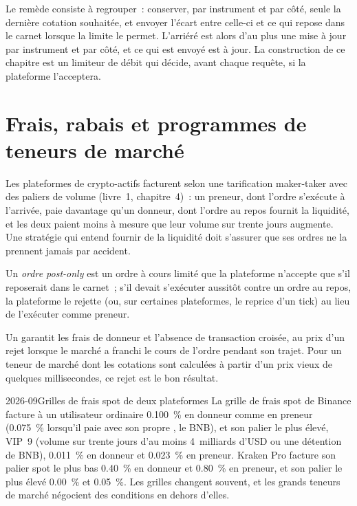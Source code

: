 Le remède consiste à regrouper~: conserver, par instrument et par côté, seule la dernière cotation souhaitée, et envoyer
l'écart entre celle-ci et ce qui repose dans le carnet lorsque la limite le permet. L'arriéré est alors d'au plus une
mise à jour par instrument et par côté, et ce qui est envoyé est à jour. La construction de ce chapitre est un limiteur
de débit qui décide, avant chaque requête, si la plateforme l'acceptera.

\section{Frais, rabais et programmes de teneurs de marché}

Les plateformes de crypto-actifs facturent selon une tarification maker-taker avec des paliers de volume (livre~1, chapitre~4)~: un preneur,
dont l'ordre s'exécute à l'arrivée, paie davantage qu'un donneur, dont l'ordre au repos fournit la liquidité, et les deux
paient moins à mesure que leur volume sur trente jours augmente. Une stratégie qui entend fournir de la liquidité doit s'assurer
que ses ordres ne la prennent jamais par accident.

\begin{definition}\label{def:m3:centralised-exchanges:postonly}
Un \emph{ordre post-only} est un ordre à cours limité que la plateforme n'accepte que s'il
reposerait dans le carnet~; s'il devait s'exécuter aussitôt contre un ordre au repos, la plateforme le rejette (ou, sur
certaines plateformes, le reprice d'un tick) au lieu de l'exécuter comme preneur.
\end{definition}

Un  garantit les frais de donneur et l'absence de transaction croisée, au prix d'un rejet lorsque le
marché a franchi le cours de l'ordre pendant son trajet. Pour un teneur de marché dont les cotations sont calculées à
partir d'un prix vieux de quelques millisecondes, ce rejet est le bon résultat.

\begin{dated}{2026-09}{Grilles de frais spot de deux plateformes}\label{dat:m3:centralised-exchanges:fees}
La grille de frais spot de Binance facture à un utilisateur ordinaire 0.100~\% en donneur comme en preneur (0.075~\% lorsqu'il paie
avec son propre , le BNB), et son palier le plus élevé, VIP~9 (volume sur trente jours d'au moins 4~milliards d'USD
ou une détention de BNB), 0.011~\% en donneur et 0.023~\% en preneur. Kraken Pro facture son palier spot le plus bas 0.40~\% en donneur
et 0.80~\% en preneur, et son palier le plus élevé 0.00~\% et 0.05~\%. Les grilles changent souvent, et les grands teneurs
de marché négocient des conditions en dehors d'elles.
\end{dated}

